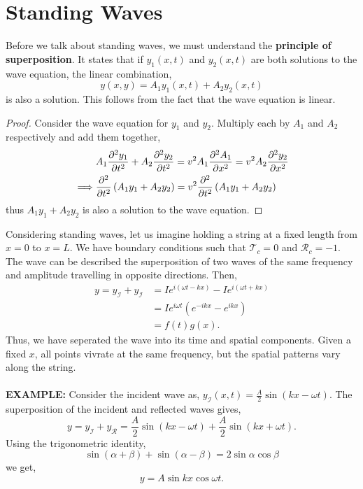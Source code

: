 \documentclass{book}
\begin{document}
\section{Standing Waves}
Before we talk about standing waves, we must understand the \textbf{principle of superposition}. It states that if $y_1(x,t)$ and $y_2(x,t)$ are both solutions to the wave equation, the linear combination,
\begin{equation}
	y(x,y) = A_1y_1(x,t) + A_2y_2(x,t)
\end{equation}
is also a solution. This follows from the fact that the wave equation is linear. 
\begin{proof}
	Consider the wave equation for $y_1$ and $y_2$. Multiply each by $A_1$ and $A_2$ respectively and add them together,
	\begin{equation}
		\begin{split}
			& A_1\pdv[2]{y_1}{t} + A_2\pdv[2]{y_2}{t} = v^2A_1\pdv[2]{A_1}{x} = v^2A_2\pdv[2]{y_2}{x} \\	
			\implies & \pdv[2]{}{t}\left(A_1y_1 + A_2y_2\right) = v^2\pdv[2]{}{t}\left(A_1y_1 + A_2y_2\right)
		\end{split}
	\end{equation}
	thus $A_1y_1 + A_2y_2$ is also a solution to the wave equation.
\end{proof}
Considering standing waves, let us imagine holding a string at a fixed length from $x=0$ to $x=L$. We have boundary conditions such that $\mathcal{T}_c = 0$ and $\mathcal{R}_c = -1$. The wave can be described the superposition of two waves of the same frequency and amplitude travelling in opposite directions. Then,
\begin{equation}
	\begin{split}
		y = y_{\mathcal{I}} + y_{\mathcal{I}} & = Ie^{i(\omega t - kx)} - Ie^{i(\omega t + kx)} \\
		& = Ie^{i\omega t}\left(e^{-ikx} - e^{ikx}\right) \\
		& = f(t)g(x).
	\end{split}
\end{equation}
Thus, we have seperated the wave into its time and spatial components. Given a fixed $x$, all points vivrate at the same frequency, but the spatial patterns vary along the string. \\\\
\textbf{EXAMPLE:} Consider the incident wave as, $y_{\mathcal{I}}(x,t) = \frac{A}{2}\sin(kx - \omega t)$. The superposition of the incident and reflected waves gives,
\begin{equation}
	y = y_{\mathcal{I}} + y_{\mathcal{R}} = \frac{A}{2}\sin(kx - \omega t) + \frac{A}{2}\sin(kx + \omega t).
\end{equation}
Using the trigonometric identity,
\begin{equation}
	\sin(\alpha + \beta) + \sin(\alpha - \beta) = 2\sin\alpha\cos\beta 
\end{equation}
we get,
\begin{equation}
	y = A\sin kx \cos\omega t.
\end{equation}
\end{document}
